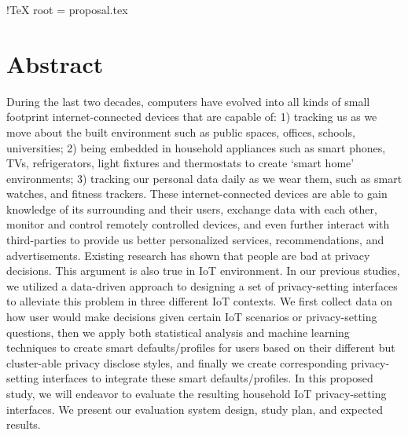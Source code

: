 !TeX root = proposal.tex
\chapter{Abstract}

During the last two decades, computers have evolved into all kinds of small footprint internet-connected devices that are capable of: 1) tracking us as we move about the built environment such as public spaces, offices, schools, universities; 2) being embedded in household appliances such as smart phones, TVs, refrigerators, light fixtures and thermostats to create `smart home' environments; 3) tracking our personal data daily as we wear them, such as smart watches, and fitness trackers. These internet-connected devices are able to gain knowledge of its surrounding and their users, exchange data with each other, monitor and control remotely controlled devices, and even further interact with third-parties to provide us better personalized services, recommendations, and advertisements. Existing research has shown that people are bad at privacy decisions. This argument is also true in IoT environment. In our previous studies, we utilized a data-driven approach to designing a set of privacy-setting interfaces to alleviate this problem in three different IoT contexts. We first collect data on how user would make decisions given certain IoT scenarios or privacy-setting questions, then we apply both statistical analysis and machine learning techniques to create smart defaults/profiles for users based on their different but cluster-able privacy disclose styles, and finally we create corresponding privacy-setting interfaces to integrate these smart defaults/profiles. In this proposed study, we will endeavor to evaluate the resulting household IoT privacy-setting interfaces. We present our evaluation system design, study plan, and expected results. 

